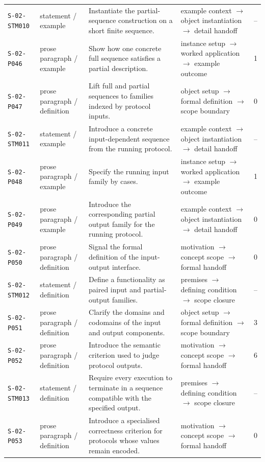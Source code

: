 \documentclass[10pt]{article}
\begin{document}
\begin{longtable}{@{}p{}p{}p{}p{}p{}@{}}
\texttt{S-02-STM010}&statement / example&Instantiate the partial-sequence construction on a short finite sequence.&example context $\rightarrow$ object instantiation $\rightarrow$ detail handoff&--\\
\texttt{S-02-P046}&prose paragraph / example&Show how one concrete full sequence satisfies a partial description.&instance setup $\rightarrow$ worked application $\rightarrow$ example outcome&1\\
\texttt{S-02-P047}&prose paragraph / definition&Lift full and partial sequences to families indexed by protocol inputs.&object setup $\rightarrow$ formal definition $\rightarrow$ scope boundary&0\\
\texttt{S-02-STM011}&statement / example&Introduce a concrete input-dependent sequence from the running protocol.&example context $\rightarrow$ object instantiation $\rightarrow$ detail handoff&--\\
\texttt{S-02-P048}&prose paragraph / example&Specify the running input family by cases.&instance setup $\rightarrow$ worked application $\rightarrow$ example outcome&1\\
\texttt{S-02-P049}&prose paragraph / example&Introduce the corresponding partial output family for the running protocol.&example context $\rightarrow$ object instantiation $\rightarrow$ detail handoff&0\\
\texttt{S-02-P050}&prose paragraph / definition&Signal the formal definition of the input-output interface.&motivation $\rightarrow$ concept scope $\rightarrow$ formal handoff&0\\
\texttt{S-02-STM012}&statement / definition&Define a functionality as paired input and partial-output families.&premises $\rightarrow$ defining condition $\rightarrow$ scope closure&--\\
\texttt{S-02-P051}&prose paragraph / definition&Clarify the domains and codomains of the input and output components.&object setup $\rightarrow$ formal definition $\rightarrow$ scope boundary&3\\
\texttt{S-02-P052}&prose paragraph / definition&Introduce the semantic criterion used to judge protocol outputs.&motivation $\rightarrow$ concept scope $\rightarrow$ formal handoff&6\\
\texttt{S-02-STM013}&statement / definition&Require every execution to terminate in a sequence compatible with the specified output.&premises $\rightarrow$ defining condition $\rightarrow$ scope closure&--\\
\texttt{S-02-P053}&prose paragraph / definition&Introduce a specialised correctness criterion for protocols whose values remain encoded.&motivation $\rightarrow$ concept scope $\rightarrow$ formal handoff&0\\

\end{longtable}
\end{document}
